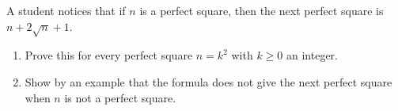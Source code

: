 A student notices that if $n$ is a perfect square, then the next perfect square is $n+2\sqrt n+1$.
\begin{enumerate}
\item[(a)] Prove this for every perfect square $n=k^2$ with $k\ge0$ an integer.
\item[(b)] Show by an example that the formula does not give the next perfect square when $n$ is not a perfect square.
\end{enumerate}

